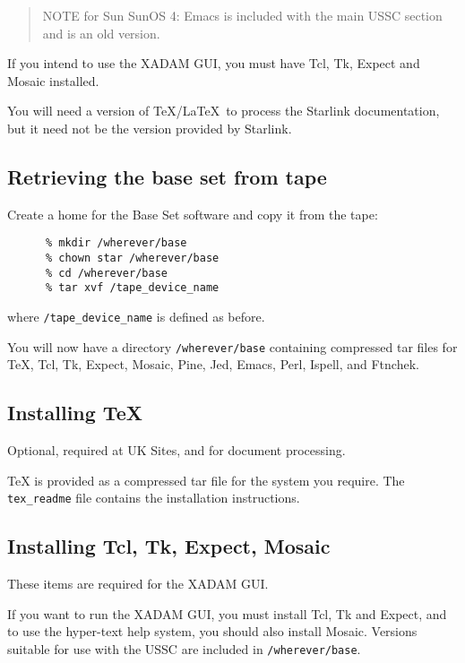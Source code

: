 \begin{quote}
NOTE for Sun SunOS 4: Emacs is included with the main USSC section and is 
an old version. 
\end{quote}

If you intend to use the XADAM GUI, you must have Tcl, Tk, Expect and Mosaic
installed.  

You will need a version of \TeX/\LaTeX\ to process the Starlink documentation,
but it need not be the version provided by Starlink.

\subsection{Retrieving the base set from tape}
\label{s:ibase:tape}

Create a home for the Base Set software and copy it from the tape:

\begin{verbatim}
      % mkdir /wherever/base
      % chown star /wherever/base
      % cd /wherever/base
      % tar xvf /tape_device_name
\end{verbatim}

where \verb+/tape_device_name+ is defined as before.

You will now have a directory {\tt /wherever/base} containing compressed tar 
files for \TeX , Tcl, Tk, Expect, Mosaic, Pine, Jed, Emacs, Perl, Ispell, 
and Ftnchek.  

\subsection{Installing \TeX}
\label{s:ibase:tex}

Optional, required at UK Sites, and for document processing.

TeX is provided as a compressed tar file for the system you require.
The {\tt tex\_readme} file contains the installation instructions.

\subsection{Installing Tcl, Tk, Expect, Mosaic}
\label{s:ibase:tcl}

These items are required for the XADAM GUI.

If you want to run the XADAM GUI, you must install Tcl, Tk and Expect,
and to use the hyper-text help system, you should also install Mosaic.
Versions suitable for use with the USSC are included in
{\tt /wherever/base}.

